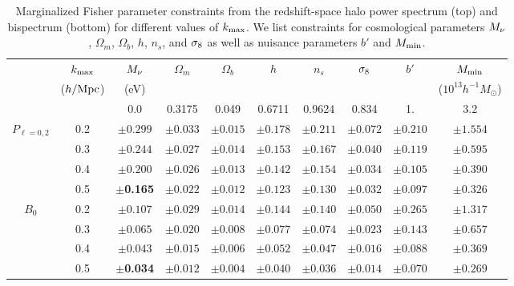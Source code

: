 \begin{table}
    \caption{Marginalized Fisher parameter constraints from the redshift-space halo power 
    spectrum (top) and bispectrum (bottom) for different values of $k_{\rm max}$. We list 
    constraints for cosmological parameters $M_\nu$, $\Omega_m$, $\Omega_b$, $h$, $n_s$, 
    and $\sigma_8$ as well as nuisance parameters $b'$ and $M_{\rm min}$.} 
\begin{center} 
    \begin{tabular}{cccccccccc} \toprule
         & $k_{\rm max}$ & $M_\nu$ & $\Omega_m$ & $\Omega_b$ & $h$ & $n_s$ & $\sigma_8$ & $b'$ & $M_{\rm min}$ \\
         & ({\footnotesize $h/{\rm Mpc}$}) &({\footnotesize eV}) & & & & & & & ({\footnotesize $10^{13} h^{-1}M_\odot$}) \\[3pt] \hline\hline

            &     & 0.0 & 0.3175 & 0.049 & 0.6711 & 0.9624 & 0.834 & 1. & 3.2  \\ 
$P_{\ell=0,2}$  & 0.2 &$\pm0.299$ & $\pm0.033$ & $\pm0.015$ & $\pm0.178$ & $\pm0.211$ & $\pm0.072$ & $\pm0.210$ & $\pm1.554$\\
            & 0.3 &$\pm0.244$ & $\pm0.027$ & $\pm0.014$ & $\pm0.153$ & $\pm0.167$ & $\pm0.040$ & $\pm0.119$ & $\pm0.595$\\
            & 0.4 &$\pm0.200$ & $\pm0.026$ & $\pm0.013$ & $\pm0.142$ & $\pm0.154$ & $\pm0.034$ & $\pm0.105$ & $\pm0.390$\\
       & 0.5 &$\pm${\bf 0.165}& $\pm0.022$ & $\pm0.012$ & $\pm0.123$ & $\pm0.130$ & $\pm0.032$ & $\pm0.097$ & $\pm0.326$\\\hline
                   
    $B_0$  & 0.2 &$\pm0.107$ & $\pm0.029$ & $\pm0.014$ & $\pm0.144$ & $\pm0.140$ & $\pm0.050$ & $\pm0.265$ & $\pm1.317$\\
           & 0.3 &$\pm0.065$ & $\pm0.020$ & $\pm0.008$ & $\pm0.077$ & $\pm0.074$ & $\pm0.023$ & $\pm0.143$ & $\pm0.657$\\
           & 0.4 &$\pm0.043$ & $\pm0.015$ & $\pm0.006$ & $\pm0.052$ & $\pm0.047$ & $\pm0.016$ & $\pm0.088$ & $\pm0.369$\\
           & 0.5 &$\pm${\bf 0.034}& $\pm0.012$ & $\pm0.004$ & $\pm0.040$ & $\pm0.036$ & $\pm0.014$ & $\pm0.070$ & $\pm0.269$\\[3pt]

    \hline
\end{tabular} \label{tab:forecast}
\end{center}
\end{table}

